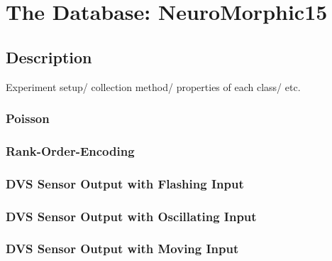 \section{The Database: NeuroMorphic15}
\label{sec:data}

\subsection{Description}
	Experiment setup/ collection method/ properties of each class/ etc.
	\subsubsection{Poisson}
	\subsubsection{Rank-Order-Encoding}
  
	\subsubsection{DVS Sensor Output with Flashing Input}
	\subsubsection{DVS Sensor Output with Oscillating Input}
	\subsubsection{DVS Sensor Output with Moving Input}
	